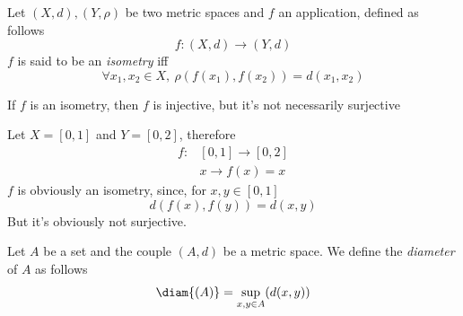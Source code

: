 \documentclass[../mmf.tex]{subfiles}
\begin{document}
\begin{dfn}[Isometry]
	Let $(X,d),(Y,\rho)$ be two metric spaces and $f$ an application, defined as follows
	\begin{equation*}
		f:(X,d)\to(Y,d)
	\end{equation*}
	$f$ is said to be an \textit{isometry} iff
	\begin{equation*}
		\forall x_1,x_2\in X,\ \rho(f(x_1),f(x_2))=d(x_1,x_2)
	\end{equation*}
\end{dfn}
\begin{rmk}
	If $f$ is an isometry, then $f$ is injective, but it's not necessarily surjective
\end{rmk}
\begin{eg}
	Let $X=[0,1]$ and $Y=[0,2]$, therefore
	\begin{equation*}
		\begin{aligned}
			f:&[0,1]\to[0,2]\\
			&x\to f(x)=x
		\end{aligned}
	\end{equation*}
	$f$ is obviously an isometry, since, for $x,y\in[0,1]$
	\begin{equation*}
		d(f(x),f(y))=d(x,y)
	\end{equation*}
	But it's obviously not surjective.
\end{eg}
\begin{dfn}
	Let $A$ be a set and the couple $(A,d)$ be a metric space. We define the \textit{diameter} of $A$ as follows
	\begin{equation*}
		\diam{(A)}=\sup_{x,y\in A}(d(x,y))
	\end{equation*}
\end{dfn}
\end{document}
